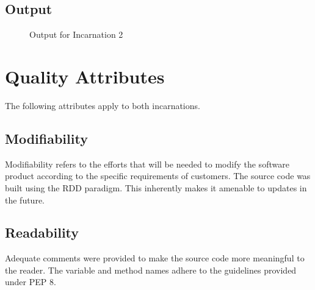     \subsection{Output}
    \begin{figure}[h!]
      \centering
      \caption{Output for Incarnation 2}
      \label{fig:XML output}
    \end{figure}

\section{Quality Attributes}
  \begin{flushleft}
    The following attributes apply to both incarnations.
  \end{flushleft}
  \subsection{Modifiability}
    \begin{flushleft}
      Modifiability refers to the efforts that will be needed to modify the software product according to the specific requirements of customers\cite{8343604}. The source code was built using the RDD paradigm. This inherently makes it amenable to updates in the future.
    \end{flushleft}

  \subsection{Readability}
    \begin{flushleft}
      Adequate comments were provided to make the source code more meaningful to the reader. The variable and method names adhere to the guidelines provided under PEP 8. 
    \end{flushleft}

